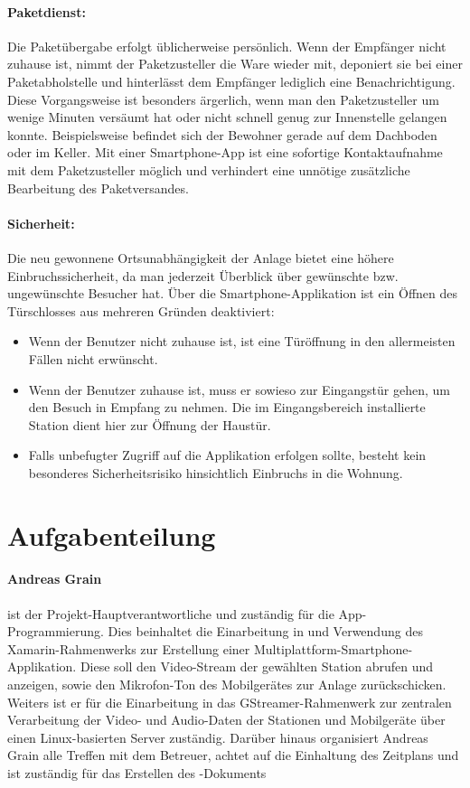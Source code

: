 \paragraph{Paketdienst:}
Die Paketübergabe erfolgt üblicherweise persönlich.
Wenn der Empfänger nicht zuhause ist, nimmt der Paketzusteller die Ware wieder mit, deponiert sie bei einer Paketabholstelle und hinterlässt dem Empfänger lediglich eine Benachrichtigung.
Diese Vorgangsweise ist besonders ärgerlich, wenn man den Paketzusteller um wenige Minuten versäumt hat oder nicht schnell genug zur Innenstelle gelangen konnte.
Beispielsweise befindet sich der Bewohner gerade auf dem Dachboden oder im Keller.
Mit einer Smartphone-App ist eine sofortige Kontaktaufnahme mit dem Paketzusteller möglich und verhindert eine unnötige zusätzliche Bearbeitung des Paketversandes.

\paragraph{Sicherheit:}
Die neu gewonnene Ortsunabhängigkeit der Anlage bietet eine höhere Einbruchssicherheit, da man jederzeit Überblick über gewünschte bzw. ungewünschte Besucher hat.
Über die Smartphone-Applikation ist ein Öffnen des Türschlosses aus mehreren Gründen deaktiviert:
\begin{itemize}
    \item Wenn der Benutzer nicht zuhause ist, ist eine Türöffnung in den allermeisten Fällen nicht erwünscht.
    \item Wenn der Benutzer zuhause ist, muss er sowieso zur Eingangstür gehen, um den Besuch in Empfang zu nehmen. Die im Eingangsbereich installierte Station dient hier zur Öffnung der Haustür.
    \item Falls unbefugter Zugriff auf die Applikation erfolgen sollte, besteht kein besonderes Sicherheitsrisiko hinsichtlich Einbruchs in die Wohnung.
\end{itemize}

\section{Aufgabenteilung}
\paragraph{Andreas Grain} ist der Projekt-Hauptverantwortliche und zuständig für die App-Program\-mierung.
Dies beinhaltet die Einarbeitung in und Verwendung des Xamarin-Rahmenwerks zur Erstellung einer Multiplattform-Smartphone-Applikation.
Diese soll den Video-Stream der gewählten Station abrufen und anzeigen, sowie den Mikrofon-Ton des Mobilgerätes zur Anlage zurückschicken.
Weiters ist er für die Einarbeitung in das GStreamer-Rahmenwerk zur zentralen Verarbeitung der Video- und Audio-Daten der Stationen und Mobilgeräte über einen Linux-basierten Server zuständig.
Darüber hinaus organisiert Andreas Grain alle Treffen mit dem Betreuer, achtet auf die Einhaltung des Zeitplans und ist zuständig für das Erstellen des  -Dokuments

